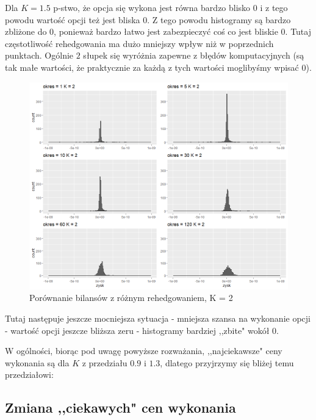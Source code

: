 \documentclass[12pt]{article}
\begin{document}
Dla $K=1.5$ p-stwo, że opcja się wykona jest równa bardzo blisko $0$ i z tego powodu wartość opcji też jest bliska $0$. Z tego powodu histogramy są bardzo zbliżone do $0$, ponieważ bardzo łatwo jest zabezpieczyć coś co jest bliskie $0$. Tutaj częstotliwość rehedgowania ma dużo mniejszy wpływ niż w poprzednich punktach. Ogólnie $2$ słupek się wyróżnia zapewne z błędów komputacyjnych (są tak małe wartości, że praktycznie za każdą z tych wartości moglibyśmy wpisać $0$).

\newpage

\begin{figure}[ht!]
\centering
\includegraphics[width=\linewidth]{bilanse_gold_2.png}
\caption{Porównanie bilansów z różnym rehedgowaniem, K = 2}
\end{figure}

Tutaj następuje jeszcze mocniejsza sytuacja - mniejsza szansa na wykonanie opcji - wartość opcji jeszcze bliższa zeru - histogramy bardziej ,,zbite" wokół $0$.

\newline
W ogólności, biorąc pod uwagę powyższe rozważania, ,,najciekawsze" ceny wykonania są dla $K$ z przedziału $0.9$ i $1.3$, dlatego przyjrzymy się bliżej temu przedziałowi:
\newpage
\subsection{Zmiana ,,ciekawych" cen wykonania}
\end{document}
